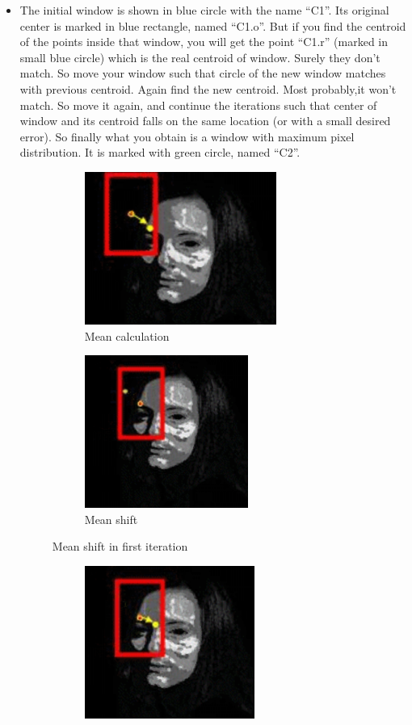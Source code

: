 \documentclass[11pt,a4paper]{article}
\begin{document}
\begin{itemize}
\begin{itemize}
  \item  The initial window is shown in blue circle with the name “C1”. Its original center is marked in blue rectangle, named “C1.o”. But if you find the centroid of the points inside that window, you will get the point “C1.r” (marked in small blue circle) which is the real centroid of window. Surely they don’t match. So move your window such that circle of the new window matches with previous centroid. Again find the new centroid. Most probably,it won’t match. So move it again, and continue the iterations such that center of window and its centroid falls on the same location (or with a small desired error). So finally what you obtain is a window with maximum pixel distribution. It is marked with green circle, named “C2”.
  \newline
  \begin{figure}[h!]
 \begin{subfigure}{0.5\textwidth}
\includegraphics[width=0.9\linewidth, height=5cm]{mc1.png} 
\caption{Mean calculation}
\end{subfigure}
\begin{subfigure}{0.5\textwidth}
\includegraphics[width=0.9\linewidth, height=5cm]{ms1.png}
\caption{Mean shift}
\end{subfigure}
 \caption{Mean shift in first iteration}
\end{figure}
\begin{figure}[h!]
 \begin{subfigure}{0.5\textwidth}
\includegraphics[width=0.9\linewidth, height=5cm]{mc2.png} 

\end{subfigure}
\end{figure}
\end{itemize}
\end{itemize}
\end{document}
